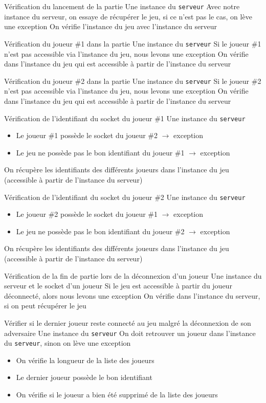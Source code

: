 \mytest
{Vérification du lancement de la partie}
{Une instance du \texttt{serveur}}
{Avec notre instance du serveur, on essaye de récupérer le jeu, si ce n'est pas le cas, on lève une exception}
{On vérifie l'instance du jeu avec l'instance du serveur}

\mytest
{Vérification du joueur \#1 dans la partie}
{Une instance du \texttt{serveur}}
{Si le joueur \#1 n'est pas accessible via l'instance du jeu, nous levons une exception}
{On vérifie dans l'instance du jeu qui est accessible à partir de l'instance du serveur}

\mytest
{Vérification du joueur \#2 dans la partie}
{Une instance du \texttt{serveur}}
{Si le joueur \#2 n'est pas accessible via l'instance du jeu, nous levons une exception}
{On vérifie dans l'instance du jeu qui est accessible à partir de l'instance du serveur}

\mytest
{Vérification de l'identifiant du socket du joueur \#1}
{Une instance du \texttt{serveur}}
{
    \begin{itemize}
        \item Le joueur \#1 possède le socket du joueur \#2 $\rightarrow$ exception
        \item Le jeu ne possède pas le bon identifiant du joueur \#1 $\rightarrow$ exception
    \end{itemize}
}
{On récupère les identifiants des différents joueurs dans l'instance du jeu (accessible à partir de l'instance du serveur)}

\mytest
{Vérification de l'identifiant du socket du joueur \#2}
{Une instance du \texttt{serveur}}
{
    \begin{itemize}
        \item Le joueur \#2 possède le socket du joueur \#1 $\rightarrow$ exception
        \item Le jeu ne possède pas le bon identifiant du joueur \#2 $\rightarrow$ exception
    \end{itemize}
}
{On récupère les identifiants des différents joueurs dans l'instance du jeu (accessible à partir de l'instance du serveur)}

\mytest
{Vérification de la fin de partie lors de la déconnexion d'un joueur}
{Une instance du serveur et le socket d'un joueur}
{Si le jeu est accessible à partir du joueur déconnecté, alors nous levons une exception}
{On vérifie dans l'instance du serveur, si on peut récupérer le jeu}

\mytest
{Vérifier si le dernier joueur reste connecté au jeu malgré la déconnexion de son adversaire}
{Une instance du \texttt{serveur}}
{On doit retrouver un joueur dans l'instance du \texttt{serveur}, sinon on lève une exception}
{
    \begin{itemize}
        \item On vérifie la longueur de la liste des joueurs
        \item Le dernier joueur possède le bon identifiant
        \item On vérifie si le joueur a bien été supprimé de la liste des joueurs
    \end{itemize}
}

